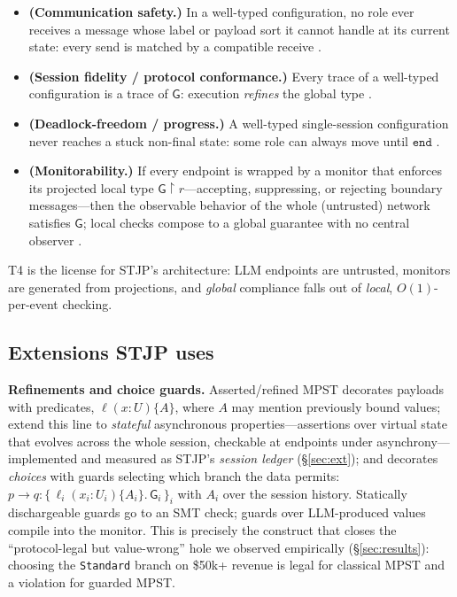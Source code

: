\documentclass{article}
\newcommand{\gtG}{\mathsf{G}}
\newcommand{\ed}{\mathtt{end}}
\newcommand{\proj}[2]{#1\!\upharpoonright\!#2}
\newcommand{\sends}{\rightarrow}
\newcommand{\lbl}{\ell}
\newcommand{\stjp}{\textsc{STJP}}
\begin{document}
\begin{itemize}\itemsep1pt
\item[\textbf{T1}] \textbf{(Communication safety.)} In a well-typed configuration, no role ever receives a message whose label or payload sort it cannot handle at its current state: every send is matched by a compatible receive \citep{hyc08}.
\item[\textbf{T2}] \textbf{(Session fidelity / protocol conformance.)} Every trace of a well-typed configuration is a trace of $\gtG$: execution \emph{refines} the global type \citep{hyc08,scalas19}.
\item[\textbf{T3}] \textbf{(Deadlock-freedom / progress.)} A well-typed single-session configuration never reaches a stuck non-final state: some role can always move until $\ed$ \citep{hyc08,scalas19}.
\item[\textbf{T4}] \textbf{(Monitorability.)} If every endpoint is wrapped by a monitor that enforces its projected local type $\proj{\gtG}{r}$---accepting, suppressing, or rejecting boundary messages---then the observable behavior of the whole (untrusted) network satisfies $\gtG$; local checks compose to a global guarantee with no central observer \citep{bocchi13}.
\end{itemize}
T4 is the license for \stjp{}'s architecture: LLM endpoints are untrusted, monitors are generated from projections, and \emph{global} compliance falls out of \emph{local}, $O(1)$-per-event checking.

\subsection{Extensions \stjp{} uses}
\textbf{Refinements and choice guards.} Asserted/refined MPST \citep{bocchi10,refine24} decorates payloads with predicates, $\lbl(x{:}U)\{A\}$, where $A$ may mention previously bound values; \citet{chen12} extend this line to \emph{stateful} asynchronous properties---assertions over virtual state that evolves across the whole session, checkable at endpoints under asynchrony---implemented and measured as \stjp{}'s \emph{session ledger} (\S\ref{sec:ext}); and decorates \emph{choices} with guards selecting which branch the data permits:
$p \sends q : \{\,\lbl_i(x_i{:}U_i)\{A_i\}.\,\gtG_i\,\}_{i}$ with $A_i$ over the session history. Statically dischargeable guards go to an SMT check; guards over LLM-produced values compile into the monitor. This is precisely the construct that closes the ``protocol-legal but value-wrong'' hole we observed empirically (\S\ref{sec:results}): choosing the \texttt{Standard} branch on \$50k+ revenue is legal for classical MPST and a violation for guarded MPST.
\end{document}
